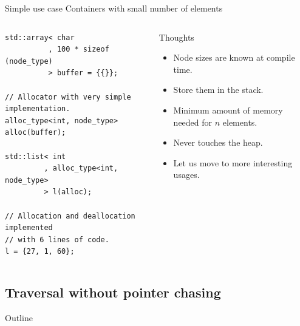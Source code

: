 \documentclass[10pt,aspectratio=169]{beamer}
\begin{document}
\begin{frame}[fragile]
{Simple use case}
{Containers with small number of elements}

\begin{columns}
\begin{column}[t]{0.47\textwidth}
\begin{lstlisting}
std::array< char
          , 100 * sizeof (node_type)
          > buffer = {{}};

// Allocator with very simple implementation.
alloc_type<int, node_type> alloc(buffer);

std::list< int
         , alloc_type<int, node_type>
         > l(alloc);

// Allocation and deallocation implemented
// with 6 lines of code.
l = {27, 1, 60};
\end{lstlisting}
\end{column}
\begin{column}[t]{0.47\textwidth}
\begin{block}{Thoughts}
\begin{itemize}
\item Node sizes are known at compile time.
\item Store them in the stack.
\item Minimum amount of memory needed for $n$ elements.
\item Never touches the heap.
\item {\color{alertc}Let us move to more interesting usages.}
\end{itemize}
\end{block}
\end{column}
\end{columns}
\end{frame}

\subsection{Traversal without pointer chasing}

\begin{frame}{Outline}
\end{frame}
\end{document}
